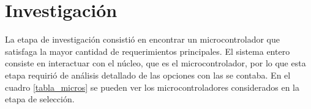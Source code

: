 \section{Investigaci\'on} %
\label{sec:investigacion}

La etapa de investigaci\'on consisti\'o en encontrar un microcontrolador que satisfaga la mayor cantidad de requerimientos principales. El sistema entero consiste en interactuar con el n\'ucleo, que es el microcontrolador, por lo que esta etapa requiri\'o de an\'alisis detallado de las opciones con las se contaba. En el cuadro \ref{tabla_micros} se pueden ver los microcontroladores considerados en la etapa de selecci\'on.

\clearpage
\begin{landscape} %


\end{landscape}
